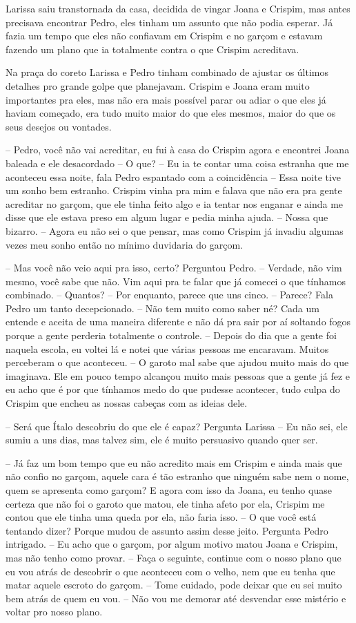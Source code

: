Larissa saiu transtornada da casa, decidida de vingar Joana e Crispim, mas antes precisava encontrar Pedro, eles tinham um assunto que não podia esperar. Já fazia um tempo que eles não confiavam em Crispim e no garçom e estavam fazendo um plano que ia totalmente contra o que Crispim acreditava.

Na praça do coreto Larissa e Pedro tinham combinado de ajustar os últimos detalhes pro grande golpe que planejavam. Crispim e Joana eram muito importantes pra eles, mas não era mais possível parar ou adiar o que eles já haviam começado, era tudo muito maior do que eles mesmos, maior do que os seus desejos ou vontades.

-- Pedro, você não vai acreditar, eu fui à casa do Crispim agora e encontrei Joana baleada e ele desacordado
-- O que?
-- Eu ia te contar uma coisa estranha que me aconteceu essa noite, fala Pedro espantado com a coincidência
-- Essa noite tive um sonho bem estranho. Crispim vinha pra mim e falava que não era pra gente acreditar no garçom, que ele tinha feito algo e ia tentar nos enganar e ainda me disse que ele estava preso em algum lugar e pedia minha ajuda.
-- Nossa que bizarro.
-- Agora eu não sei o que pensar, mas como Crispim já invadiu algumas vezes meu sonho então no mínimo duvidaria do garçom.

-- Mas você não veio aqui pra isso, certo? Perguntou Pedro.
-- Verdade, não vim mesmo, você sabe que não. Vim aqui pra te falar que já comecei o que tínhamos combinado.
-- Quantos?
-- Por enquanto, parece que uns cinco.
-- Parece? Fala Pedro um tanto decepcionado.
-- Não tem muito como saber né? Cada um entende e aceita de uma maneira diferente e não dá pra sair por aí soltando fogos porque a gente perderia totalmente o controle.
-- Depois do dia que a gente foi naquela escola, eu voltei lá e notei que várias pessoas me encaravam. Muitos perceberam o que aconteceu.
-- O garoto mal sabe que ajudou muito mais do que imaginava. Ele em pouco tempo alcançou muito mais pessoas que a gente já fez e eu acho que é por que tínhamos medo do que pudesse acontecer, tudo culpa do Crispim que encheu as nossas cabeças com as ideias dele.

-- Será que Ítalo descobriu do que ele é capaz? Pergunta Larissa
-- Eu não sei, ele sumiu a uns dias, mas talvez sim, ele é muito persuasivo quando quer ser.

-- Já faz um bom tempo que eu não acredito mais em Crispim e ainda mais que não confio no garçom, aquele cara é tão estranho que ninguém sabe nem o nome, quem se apresenta como garçom? E agora com isso da Joana, eu tenho quase certeza que não foi o garoto que matou, ele tinha afeto por ela, Crispim me contou que ele tinha uma queda por ela, não faria isso.
-- O que você está tentando dizer? Porque mudou de assunto assim desse jeito. Pergunta Pedro intrigado.
-- Eu acho que o garçom, por algum motivo matou Joana e Crispim, mas não tenho como provar.
-- Faça o seguinte, continue com o nosso plano que eu vou atrás de descobrir o que aconteceu com o velho, nem que eu tenha que matar aquele escroto do garçom.
-- Tome cuidado, pode deixar que eu sei muito bem atrás de quem eu vou.
-- Não vou me demorar até desvendar esse mistério e voltar pro nosso plano.

